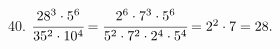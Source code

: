 40. $\cfrac{28^3\cdot5^6}{35^2\cdot10^4}=\cfrac{2^6\cdot7^3\cdot5^6}{5^2\cdot7^2\cdot2^4\cdot5^4}=2^2\cdot7=28.$\\
